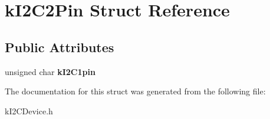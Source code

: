 \hypertarget{structkI2C2Pin}{}\section{k\+I2\+C2\+Pin Struct Reference}
\label{structkI2C2Pin}
\subsection*{Public Attributes}
\begin{DoxyCompactItemize}
\item 
unsigned char {\bfseries k\+I2\+C1pin}\hypertarget{structkI2C2Pin_a9a9957ef7a6a1f2de830f23f9cc9f2f5}{}\label{structkI2C2Pin_a9a9957ef7a6a1f2de830f23f9cc9f2f5}

\end{DoxyCompactItemize}


The documentation for this struct was generated from the following file\+:\begin{DoxyCompactItemize}
\item 
k\+I2\+C\+Device.\+h\end{DoxyCompactItemize}
